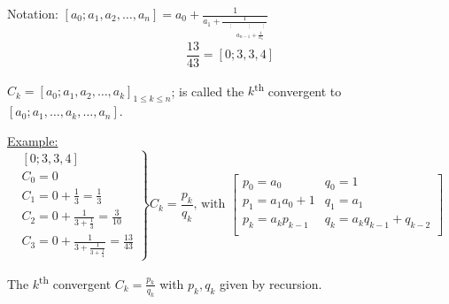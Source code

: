 \documentclass{report}
\newcommand{\up}[1]{\textsuperscript{#1}}
\begin{document}
Notation: $[a_0;a_1,a_2,\dots,a_n]=a_0+\frac{1}{a_1+\frac{1}{\begin{array}{lcl}
																															&\scriptstyle{\vdots}& \qquad \scriptstyle{\vdots \qquad \vdots}\\
																															&&\scriptstyle{a_{n-1}+\frac{1}{a_n}}
																															\end{array}}}$
					\[\frac{13}{43}=[0;3,3,4]\]
\begin{defi} $C_k=[a_0;a_1,a_2,\dots,a_k]_{1\leq k\leq n}$;  is called the $k$\up{th} convergent to $[a_0;a_1,\dots,a_k,\dots,a_n]$.
\end{defi}
\underline{Example:} \[	\left.
												\begin{array}{lcl}
												[0;3,3,4]\\
												C_0=0\\
												C_1=0+\frac{1}{3}=\frac{1}{3}\\
												C_2=0+\frac{1}{3+\frac{1}{3}}=\frac{3}{10}\\
												C_3=0+\frac{1}{3+\frac{1}{3+\frac{1}{4}}}=\frac{13}{43}
												\end{array}
												\right \} C_k=\frac{p_k}{q_k}\text{, with  }
												\left [
												\begin{array}{lll}
												p_0=a_0&q_0=1\\
												p_1=a_1a_0+1&q_1=a_1\\
												p_k=a_kp_{k-1}&q_k=a_kq_{k-1}+q_{k-2}\\
												\end{array}
												\right ]
												\]
\begin{thm} The $k$\up{th} convergent $C_k=\frac{p_k}{q_k}$ with $p_k, q_k$ given by recursion.
\end{thm}
\end{document}
